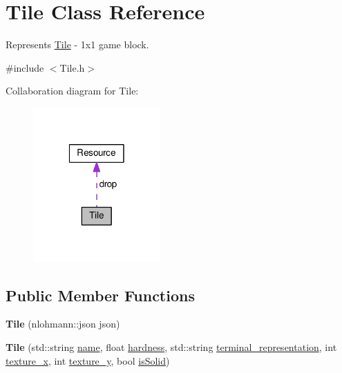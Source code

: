 \hypertarget{classTile}{\section{Tile Class Reference}
\label{classTile}
}


Represents \hyperlink{classTile}{Tile} -\/ 1x1 game block.  




{\ttfamily \#include $<$Tile.\-h$>$}



Collaboration diagram for Tile\-:
\nopagebreak
\begin{figure}[H]
\begin{center}
\leavevmode
\includegraphics[width=138pt]{classTile__coll__graph}
\end{center}
\end{figure}
\subsection*{Public Member Functions}
\begin{DoxyCompactItemize}
\item 
\hypertarget{classTile_a135790fef385f3021dccf9dde464432c}{{\bfseries Tile} (nlohmann\-::json json)}\label{classTile_a135790fef385f3021dccf9dde464432c}

\item 
\hypertarget{classTile_a0cd19571a292b010a988ad96769a675b}{{\bfseries Tile} (std\-::string \hyperlink{classTile_aa5408d0f0f4a60f25796f651db2f84ac}{name}, float \hyperlink{classTile_accd68364f51cf745c5c95717a164b2e9}{hardness}, std\-::string \hyperlink{classTile_a4792f343c63f2b7c1bf1a7321ba60206}{terminal\-\_\-representation}, int \hyperlink{classTile_ac1b8010b027d438ee826af235dc00fe1}{texture\-\_\-x}, int \hyperlink{classTile_addde9f80a365eae65b1f4bc156f18722}{texture\-\_\-y}, bool \hyperlink{classTile_a3a32e61b42ec4bc8bb1d924261c19403}{is\-Solid})}\label{classTile_a0cd19571a292b010a988ad96769a675b}

\end{DoxyCompactItemize}
